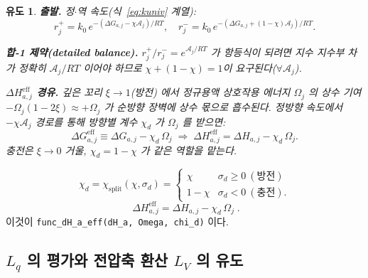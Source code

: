 \documentclass[11pt,a4paper]{article}
\newtheorem*{derivebox}{유도}
\newcommand{\eff}{\mathrm{eff}}
\newcommand{\code}[1]{\texttt{#1}}
\begin{document}
\begin{derivebox}
\textbf{출발.} 정$\cdot$역 속도(식~\eqref{eq:kuniv} 계열):
\begin{equation*}
r_j^+=k_0\,e^{-(\Delta G_{a,j}-\chi\mathcal A_j)/RT},\quad
r_j^-=k_0\,e^{-(\Delta G_{a,j}+(1-\chi)\mathcal A_j)/RT}.
\end{equation*}

\textbf{합-1 제약(detailed balance).}
$r_j^+/r_j^-=e^{\mathcal A_j/RT}$ 가 항등식이 되려면 지수 지수부 차가 정확히 $\mathcal A_j/RT$ 이어야 하므로
$\chi+(1-\chi)=1$이 요구된다($\forall\mathcal A_j$).

\textbf{$\Delta H_{a,j}^\eff$ 경유.} 깊은 꼬리 $\xi\to1$(방전) 에서 정규용액 상호작용 에너지 $\Omega_j$ 의 상수 기여
$-\Omega_j(1-2\xi)\approx+\Omega_j$ 가 순방향 장벽에 상수 몫으로 흡수된다. 정방향 속도에서
$-\chi\mathcal A_j$ 경로를 통해 방향별 계수 $\chi_d$ 가 $\Omega_j$ 를 받으면:
\begin{equation*}
\Delta G_{a,j}^\eff \equiv \Delta G_{a,j} - \chi_d\,\Omega_j
\;\Longrightarrow\;
\Delta H_{a,j}^\eff = \Delta H_{a,j} - \chi_d\,\Omega_j.
\end{equation*}
충전은 $\xi\to0$ 거울, $\chi_d=1-\chi$ 가 같은 역할을 맡는다.
\end{derivebox}
\begin{equation}
\chi_d=\chi_\mathrm{split}(\chi,\sigma_d)=
\begin{cases}\chi & \sigma_d\ge0\ (\text{방전})\\ 1-\chi & \sigma_d<0\ (\text{충전}).\end{cases}
\label{eq:chid}
\end{equation}
\begin{equation}
\boxed{\;\Delta H_{a,j}^\eff=\Delta H_{a,j}-\chi_d\,\Omega_j\;.}
\label{eq:dHeff}
\end{equation}
이것이 \code{func\_dH\_a\_eff(dH\_a, Omega, chi\_d)} 이다.

\subsection{$L_q$ 의 평가와 전압축 환산 $L_V$ 의 유도}
\end{document}
